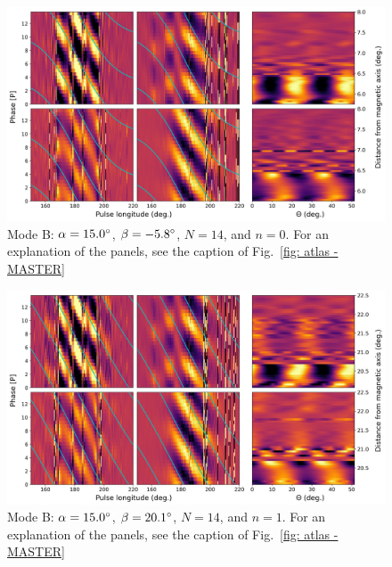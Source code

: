 \begin{figure}
	\begin{center}
		\includegraphics[width=\atlasHeightFrac\textwidth]{Figures/B0031/atlas/B_517015014000_plots}
		\caption[Atlas results: Mode B -- $\alpha=15.0\degr$, $\beta=-5.8\degr$, $N=14$, $n=0$]{Mode B: $\alpha=15.0\degr$, $\beta=-5.8\degr$, $N=14$, and $n=0$. For an explanation of the panels, see the caption of Fig.~\ref{fig: atlas - MASTER} }
		\label{fig: atlas - B_517015014000}
	\end{center}
\end{figure}

\begin{figure}
	\begin{center}
		\includegraphics[width=\atlasHeightFrac\textwidth]{Figures/B0031/atlas/B_517015014001_plots}
		\caption[Atlas results: Mode B -- $\alpha=15.0\degr$, $\beta=20.1\degr$, $N=14$, $n=1$]{Mode B: $\alpha=15.0\degr$, $\beta=20.1\degr$, $N=14$, and $n=1$. For an explanation of the panels, see the caption of Fig.~\ref{fig: atlas - MASTER} }
		\label{fig: atlas - B_517015014001}
	\end{center}
\end{figure}

